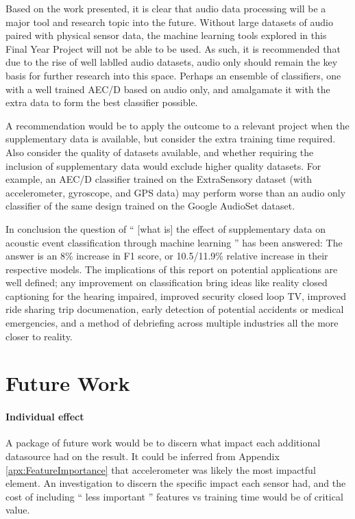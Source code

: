 \documentclass{UoNMCHA}
\newcommand{\inlineQuote}[1]{`` #1 ''}
\newcommand{\aref}[1] {Appendix \ref{#1}}
\numberwithin{equation}{section}
\begin{document}
Based on the work presented, it is clear that audio data processing will be a major tool and research topic into the future. Without large datasets of audio paired with physical sensor data, the machine learning tools explored in this Final Year Project will not be able to be used. As such, it is recommended that due to the rise of well lablled audio datasets, audio only should remain the key basis for further research into this space. Perhaps an ensemble of classifiers, one with a well trained AEC/D based on audio only, and amalgamate it with the extra data to form the best classifier possible.

A recommendation would be to apply the outcome to a relevant project when the supplementary data is available, but consider the extra training time required. Also consider the quality of datasets available, and whether requiring the inclusion of supplementary data would exclude higher quality datasets. For example, an AEC/D classifier trained on the ExtraSensory dataset (with accelerometer, gyroscope, and GPS data) may perform worse than an audio only classifier of the same design trained on the Google AudioSet dataset.

In conclusion the question of \inlineQuote{[what is] the effect of supplementary data on acoustic event classification through machine learning} has been answered: The answer is an 8\% increase in F1 score, or 10.5/11.9\% relative increase in their respective models. The implications of this report on potential applications are well defined; any improvement on classification bring ideas like reality closed captioning for the hearing impaired, improved security closed loop TV, improved ride sharing trip documenation, early detection of potential accidents or medical emergencies, and a method of debriefing across multiple industries all the more closer to reality.



\clearpage \section{Future Work}\label{sec:futurework}
\paragraph{Individual effect}
A package of future work would be to discern what impact each additional datasource had on the result. It could be inferred from \aref{apx:FeatureImportance} that accelerometer was likely the most impactful element. An investigation to discern the specific impact each sensor had, and the cost of including \inlineQuote{less important} features vs training time would be of critical value. 
\end{document}
